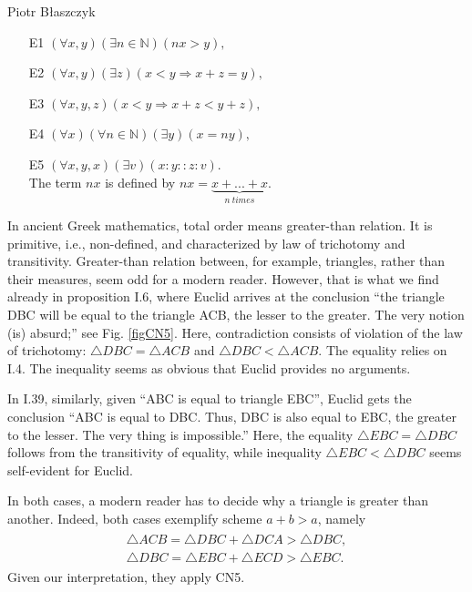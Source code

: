 \begin{artengenv}{Piotr Błaszczyk}
\begin{itemize}\itemsep 0.5mm\itemsep 0.5mm
\item [E1] $(\forall{x,y})(\exists n \in \mathbb{N}) (nx> y),$
\item [E2] $(\forall{x,y})(\exists z) ( x<y \Rightarrow x+z=y),$
\item [E3] $(\forall{x,y,z})(x < y \Rightarrow x+z <y+z),$
\item [E4] $(\forall {x}) (\forall n \in \mathbb{N})(\exists y)(x=ny),$
 \item [E5] $(\forall x,y,x)(\exists v)(x:y::z:v)$.\\
The term $nx$ is defined by $nx=\underbrace{x+...+x}_{n\ times}$.
\end{itemize} 

In ancient Greek mathematics, total order  means {greater-than} relation.  It is  primitive, i.e., non-defined, 
and characterized by law of trichotomy  and transitivity.
{Greater-than} relation between, for example, triangles, rather than their measures, seem odd for a modern reader. However, that is what we find already in proposition I.6, where Euclid arrives at the conclusion
``the triangle DBC will be equal to the triangle ACB, 
the lesser to the greater. The very notion (is) absurd;'' see Fig. \ref{figCN5}. Here, contradiction consists of violation of the law of trichotomy:  $\triangle DBC =\triangle ACB$  and $\triangle DBC <\triangle ACB$. The  equality relies on I.4. The inequality seems as obvious that Euclid provides no arguments.






In I.39, similarly, given  ``ABC is equal to  triangle
EBC'', Euclid gets the conclusion ``ABC is equal to
DBC. Thus, DBC is also equal to EBC, the greater to
the lesser. The very thing is impossible.'' Here, the equality $\triangle EBC=\triangle DBC$ follows from the transitivity of equality, while inequality $\triangle EBC<\triangle DBC$ seems self-evident for Euclid.


In both cases, a modern reader has to decide why a triangle is greater than another.
Indeed, both cases exemplify scheme $a+b>a$, namely 
\begin{align}
\begin{split}
\triangle ACB=\triangle DBC +\triangle DCA> \triangle DBC, \\ \triangle DBC=\triangle EBC+\triangle ECD > \triangle EBC.
\end{split}
\end{align}
Given our interpretation, they apply CN5.




\end{artengenv}
